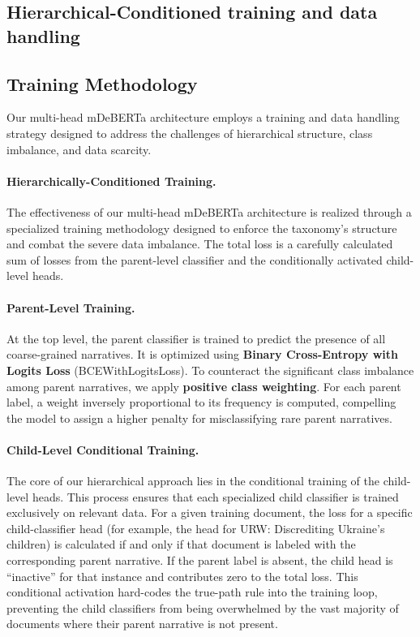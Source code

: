 \subsection{Hierarchical-Conditioned training and data handling}

\subsection{Training Methodology}

Our multi-head mDeBERTa architecture employs a training and data handling strategy designed to address the challenges of hierarchical structure, class imbalance, and data scarcity.

\paragraph{Hierarchically-Conditioned Training.}
The effectiveness of our multi-head mDeBERTa architecture is realized through a specialized training methodology designed to enforce the taxonomy's structure and combat the severe data imbalance. The total loss is a carefully calculated sum of losses from the parent-level classifier and the conditionally activated child-level heads.

\paragraph{Parent-Level Training.}
At the top level, the parent classifier is trained to predict the presence of all coarse-grained narratives. It is optimized using \textbf{Binary Cross-Entropy with Logits Loss} (BCEWithLogitsLoss). To counteract the significant class imbalance among parent narratives, we apply \textbf{positive class weighting}. For each parent label, a weight inversely proportional to its frequency is computed, compelling the model to assign a higher penalty for misclassifying rare parent narratives.

\paragraph{Child-Level Conditional Training.}
The core of our hierarchical approach lies in the conditional training of the child-level heads. This process ensures that each specialized child classifier is trained exclusively on relevant data. For a given training document, the loss for a specific child-classifier head (for example, the head for URW: Discrediting Ukraine's children) is calculated if and only if that document is labeled with the corresponding parent narrative. If the parent label is absent, the child head is ``inactive'' for that instance and contributes zero to the total loss. This conditional activation hard-codes the true-path rule into the training loop, preventing the child classifiers from being overwhelmed by the vast majority of documents where their parent narrative is not present.

